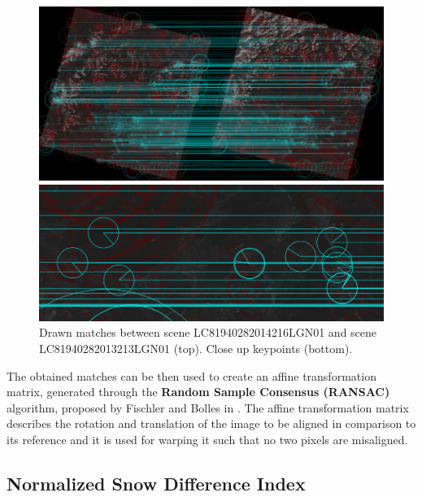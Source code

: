 \documentclass[12pt, a4paper]{report}
\begin{document}
	\begin{figure}
		\centering
		\begin{minipage}[0.2]{\columnwidth}
			\centering
			\includegraphics[width=\columnwidth]{../images/drawn_matches.png}
		\end{minipage}
		\begin{minipage}[0.2]{\columnwidth}
			\centering
			\includegraphics[width=\columnwidth]{../images/drawn_matches_small.png}
		\end{minipage}
		\caption{Drawn matches between scene LC81940282014216LGN01 and scene LC81940282013213LGN01 (top). Close up keypoints (bottom).}
		\label{fig:drawn_matches}
	\end{figure}
	
	\par The obtained matches can be then used to create an affine transformation matrix, generated through the \textbf{Random Sample Consensus (RANSAC)} algorithm, proposed by Fischler and Bolles in \cite{Fischler1981}. The affine transformation matrix describes the rotation and translation of the image to be aligned in comparison
	to its reference and it is used for warping it such that no two pixels are misaligned.
	
	\subsection{Normalized Snow Difference Index}
	\label{seq:ndsi_implementation}
	
\end{document}
